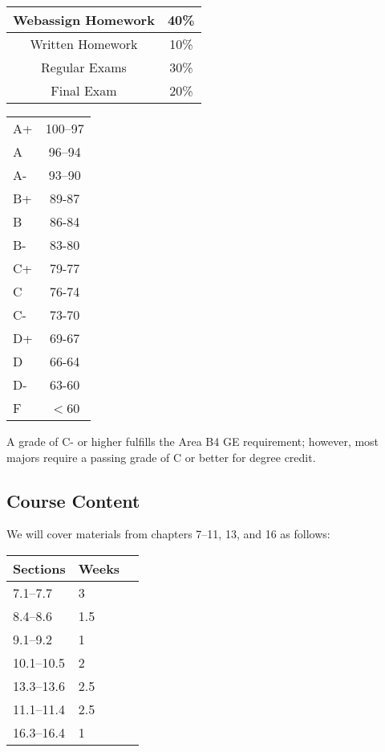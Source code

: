 \documentclass[letterpaper,12pt,fleqn]{article}
\begin{document}
\begin{minipage}{3in}
  \begin{tabular}{|c|c|}
    \hline
    Webassign Homework & 40\% \\
    \hline
    Written Homework & 10\% \\
    \hline
    Regular Exams & 30\% \\
    \hline
    Final Exam & 20\% \\
    \hline
  \end{tabular}
\end{minipage}
\begin{minipage}{3in}
  \begin{tabular}{|l|c|}
    \hline
    A+ & 100--97 \\
    A & 96--94 \\
    A- & 93--90 \\
    B+ & 89-87 \\
    B & 86-84 \\
    B- & 83-80 \\
    C+ & 79-77 \\
    C & 76-74 \\
    C- & 73-70 \\
    D+ & 69-67 \\
    D & 66-64 \\
    D- & 63-60 \\
    F & \(<\)60 \\
    \hline
  \end{tabular}
\end{minipage}

A grade of C- or higher fulfills the Area B4 GE requirement; however, most majors require a passing grade of C or
better for degree credit.

\subsection*{Course Content}

We will cover materials from chapters 7--11, 13, and 16 as follows:

\begin{tabular}{|l|l|c|}
  \hline
  \textbf{Sections} & \textbf{Weeks} \\
  \hline
  7.1--7.7 & 3 \\
  \hline
  8.4--8.6 & 1.5 \\
  \hline
  9.1--9.2 & 1 \\
  \hline
  10.1--10.5 & 2 \\
  \hline
  13.3--13.6 & 2.5 \\
  \hline
  11.1--11.4 & 2.5 \\
  \hline
  16.3--16.4 & 1 \\
  \hline
\end{tabular}
\end{document}

